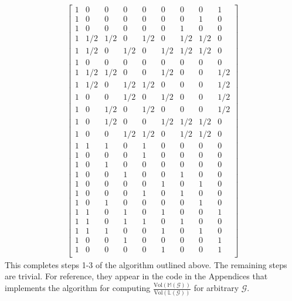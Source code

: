 \begin{equation}\label{eq:vrepfromhrep}
\begin{aligned}
\begin{bmatrix}
  1 & 0 & 0 & 0 & 0 & 0 & 0 & 0 & 1\\
  1 & 0 & 0 & 0 & 0 & 0 & 0 & 1 & 0\\
  1 & 0 & 0 & 0 & 0 & 0 & 1 & 0 & 0\\
  1 & 1/2 & 1/2 & 0 & 1/2 & 0 & 1/2 & 1/2 & 0\\
  1 & 1/2 & 0 & 1/2 & 0 & 1/2 & 1/2 & 1/2 & 0\\
  1 & 0 & 0 & 0 & 0 & 0 & 0 & 0 & 0\\
  1 & 1/2 & 1/2 & 0 & 0 & 1/2 & 0 & 0 & 1/2\\
  1 & 1/2 & 0 & 1/2 & 1/2 & 0 & 0 & 0 & 1/2\\
  1 & 0 & 0 & 1/2 & 0 & 1/2 & 0 & 0 & 1/2\\
  1 & 0 & 1/2 & 0 & 1/2 & 0 & 0 & 0 & 1/2\\
  1 & 0 & 1/2 & 0 & 0 & 1/2 & 1/2 & 1/2 & 0\\
  1 & 0 & 0 & 1/2 & 1/2 & 0 & 1/2 & 1/2 & 0\\
  1 & 1 & 1 & 0 & 1 & 0 & 0 & 0 & 0\\
  1 & 0 & 0 & 0 & 1 & 0 & 0 & 0 & 0\\
  1 & 0 & 1 & 0 & 0 & 0 & 0 & 0 & 0\\
  1 & 0 & 0 & 1 & 0 & 0 & 1 & 0 & 0\\
  1 & 0 & 0 & 0 & 0 & 1 & 0 & 1 & 0\\
  1 & 0 & 0 & 0 & 1 & 0 & 1 & 0 & 0\\
  1 & 0 & 1 & 0 & 0 & 0 & 0 & 1 & 0\\
  1 & 1 & 0 & 1 & 0 & 1 & 0 & 0 & 1\\
  1 & 1 & 0 & 1 & 1 & 0 & 1 & 0 & 0\\
  1 & 1 & 1 & 0 & 0 & 1 & 0 & 1 & 0\\
  1 & 0 & 0 & 1 & 0 & 0 & 0 & 0 & 1\\
  1 & 0 & 0 & 0 & 0 & 1 & 0 & 0 & 1\\
\end{bmatrix}
\end{aligned}
\end{equation}
This completes steps 1-3 of the algorithm outlined above. The remaining steps are trivial. For reference, they appear in the code in the Appendices that implements the algorithm for computing $\frac{\text{Vol}(\mathbb{M}(\mathcal{G}))}{\text{Vol}(\mathbb{L}(\mathcal{G}))}$ for arbitrary $\mathcal{G}$.
